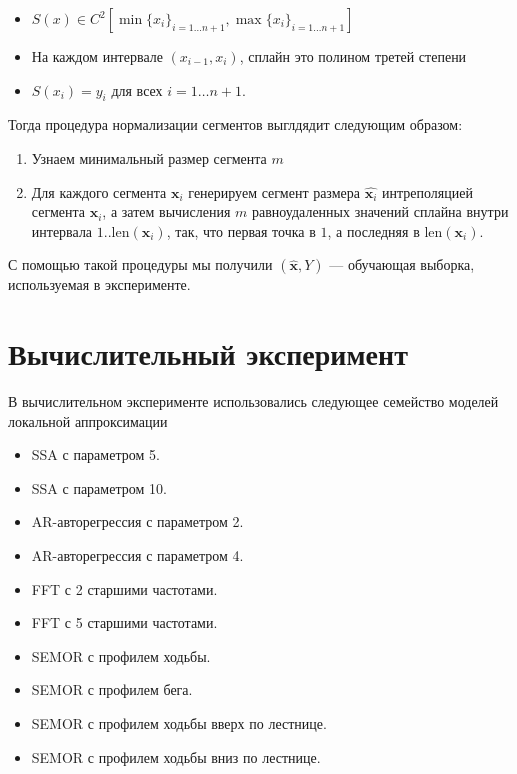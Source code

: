 \documentclass[12pt, fleqn, unicode]{article}
\newcommand{\bx}{\mathbf{x}}
\begin{document}
\begin{itemize}
    \item $S(x) \in C^2[\min\{x_i\}_{i=1\ldots n + 1}, \max\{x_i\}_{i=1\ldots n + 1}]$
    \item На каждом интервале $(x_{i - 1}, x_i)$, сплайн это полином третей степени
    \item $S(x_i) = y_i$ для всех $i = 1\ldots n + 1$.
\end{itemize}

Тогда процедура нормализации сегментов выглдядит следующим образом:

\begin{enumerate}
    \item Узнаем минимальный размер сегмента $m$
    \item Для каждого сегмента $\bx_i$ генерируем сегмент размера $\hat{\bx_i}$
    интреполяцией сегмента $\bx_i$, а затем вычисления $m$ равноудаленных
    значений сплайна внутри интервала $1..\mathrm{len}(\bx_i)$, так, что
    первая точка в $1$, а последняя в $\mathrm{len}(\bx_i)$.
\end{enumerate}

С помощью такой процедуры мы получили $(\hat{\bx}, Y)$ — обучающая выборка,
используемая в эксперименте.

\newpage
\section{Вычислительный эксперимент}

В вычислительном эксперименте использовались следующее семейство моделей
локальной аппроксимации

\begin{itemize}
    \item SSA с параметром 5.
    \item SSA с параметром 10.
    \item AR-авторегрессия с параметром 2.
    \item AR-авторегрессия с параметром 4.
    \item FFT с 2 старшими частотами.
    \item FFT с 5 старшими частотами.
    \item SEMOR с профилем ходьбы.
    \item SEMOR с профилем бега.
    \item SEMOR с профилем ходьбы вверх по лестнице.
    \item SEMOR с профилем ходьбы вниз по лестнице.
\end{itemize}
\end{document}
